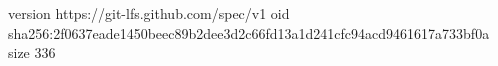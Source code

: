 version https://git-lfs.github.com/spec/v1
oid sha256:2f0637eade1450beec89b2dee3d2c66fd13a1d241cfc94acd9461617a733bf0a
size 336
